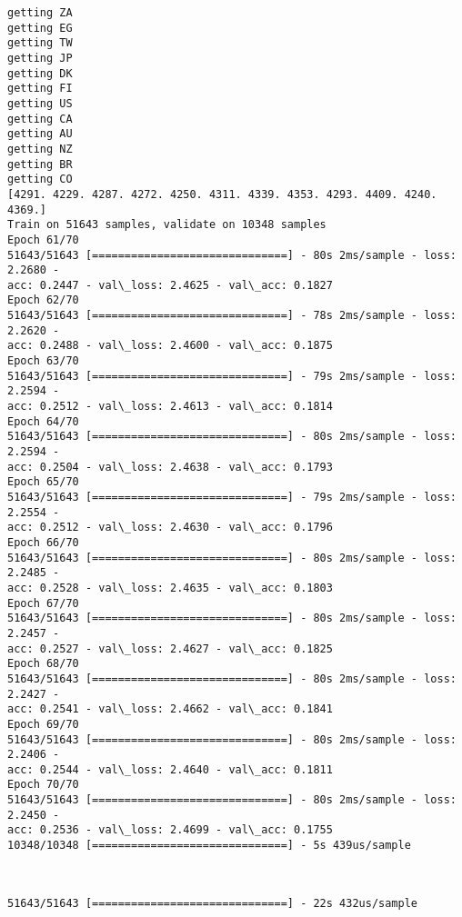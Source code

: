 \documentclass[11pt]{article}
\begin{document}
    \begin{Verbatim}[commandchars=\\\{\}]
getting ZA
getting EG
getting TW
getting JP
getting DK
getting FI
getting US
getting CA
getting AU
getting NZ
getting BR
getting CO
[4291. 4229. 4287. 4272. 4250. 4311. 4339. 4353. 4293. 4409. 4240. 4369.]
Train on 51643 samples, validate on 10348 samples
Epoch 61/70
51643/51643 [==============================] - 80s 2ms/sample - loss: 2.2680 -
acc: 0.2447 - val\_loss: 2.4625 - val\_acc: 0.1827
Epoch 62/70
51643/51643 [==============================] - 78s 2ms/sample - loss: 2.2620 -
acc: 0.2488 - val\_loss: 2.4600 - val\_acc: 0.1875
Epoch 63/70
51643/51643 [==============================] - 79s 2ms/sample - loss: 2.2594 -
acc: 0.2512 - val\_loss: 2.4613 - val\_acc: 0.1814
Epoch 64/70
51643/51643 [==============================] - 80s 2ms/sample - loss: 2.2594 -
acc: 0.2504 - val\_loss: 2.4638 - val\_acc: 0.1793
Epoch 65/70
51643/51643 [==============================] - 79s 2ms/sample - loss: 2.2554 -
acc: 0.2512 - val\_loss: 2.4630 - val\_acc: 0.1796
Epoch 66/70
51643/51643 [==============================] - 80s 2ms/sample - loss: 2.2485 -
acc: 0.2528 - val\_loss: 2.4635 - val\_acc: 0.1803
Epoch 67/70
51643/51643 [==============================] - 80s 2ms/sample - loss: 2.2457 -
acc: 0.2527 - val\_loss: 2.4627 - val\_acc: 0.1825
Epoch 68/70
51643/51643 [==============================] - 80s 2ms/sample - loss: 2.2427 -
acc: 0.2541 - val\_loss: 2.4662 - val\_acc: 0.1841
Epoch 69/70
51643/51643 [==============================] - 80s 2ms/sample - loss: 2.2406 -
acc: 0.2544 - val\_loss: 2.4640 - val\_acc: 0.1811
Epoch 70/70
51643/51643 [==============================] - 80s 2ms/sample - loss: 2.2450 -
acc: 0.2536 - val\_loss: 2.4699 - val\_acc: 0.1755
10348/10348 [==============================] - 5s 439us/sample
    \end{Verbatim}

    \begin{center}
    \end{center}
    { \hspace*{\fill} \\}
    
    \begin{Verbatim}[commandchars=\\\{\}]
51643/51643 [==============================] - 22s 432us/sample
    \end{Verbatim}

    \begin{center}
    \end{center}
    { \hspace*{\fill} \\}
    
\end{document}
